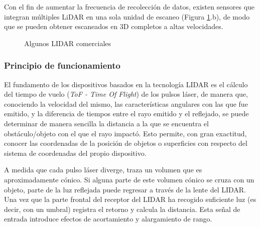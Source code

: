 Con el fin de aumentar la frecuencia de recolección de datos, existen sensores que integran múltiples LiDAR en una sola unidad de escaneo (Figura \ref{fig:lidars}.b), de modo que se pueden obtener escaneados en 3D completos a altas velocidades.

\begin{figure}[!b]
    \centering
    \qquad
    \caption{Algunos LIDAR comerciales}
    \label{fig:lidars}
\end{figure}

\subsubsection{Principio de funcionamiento}
El  fundamento de los dispositivos basados en la tecnología LIDAR es el cálculo del tiempo de vuelo (\textit{ToF - Time  Of Flight}) de los pulsos láser, de manera que, conociendo la velocidad del mismo, las características angulares con las que fue emitido, y la diferencia de tiempos entre el rayo emitido y el reflejado, se puede determinar de manera sencilla la distancia a la que se encuentra el obstáculo/objeto con el que el rayo impactó. Esto permite, con gran exactitud, conocer las coordenadas de la posición de objetos o superficies con respecto del sistema de coordenadas del propio dispositivo.

A medida que cada pulso láser diverge, traza un volumen que es aproximadamente cónico. Si alguna parte de este volumen cónico se cruza con un objeto, parte de la luz reflejada puede regresar a través de la lente del LIDAR. Una vez que la parte frontal del receptor del LIDAR ha recogido suficiente luz (es decir, con un umbral) registra el retorno y calcula la distancia. Esta señal de entrada introduce efectos de acortamiento y alargamiento de rango.

